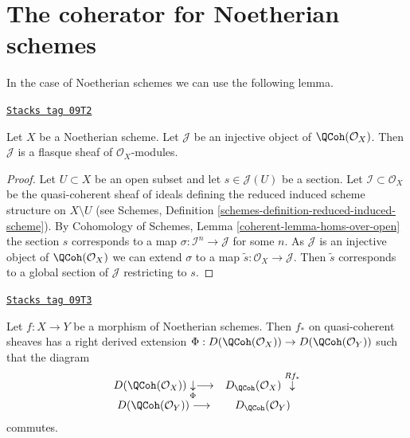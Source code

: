 \section{The coherator for Noetherian schemes}
\label{perfect-section-coherator-Noetherian}
In the case of Noetherian schemes we can use the following lemma.

\begin{lemma}
\label{perfect-lemma-injective-quasi-coherent-sheaf-Noetherian}
\href{https://stacks.math.columbia.edu/tag/09T2}{\texttt{Stacks tag 09T2}}

Let $X$ be a Noetherian scheme. Let $\mathcal{J}$ be an injective
object of $\QCoh(\mathcal{O}_X)$. Then $\mathcal{J}$
is a flasque sheaf of $\mathcal{O}_X$-modules.
\end{lemma}

\begin{proof}
Let $U \subset X$ be an open subset and let $s \in \mathcal{J}(U)$ be a section.
Let $\mathcal{I} \subset \mathcal{O}_X$ be the quasi-coherent sheaf
of ideals defining the reduced induced scheme structure on $X \setminus U$
(see Schemes, Definition \ref{schemes-definition-reduced-induced-scheme}).
By Cohomology of Schemes, Lemma \ref{coherent-lemma-homs-over-open}
the section $s$ corresponds to a map $\sigma : \mathcal{I}^n \to \mathcal{J}$
for some $n$. As $\mathcal{J}$ is an injective object of
$\QCoh(\mathcal{O}_X)$ we can extend $\sigma$ to a map
$\tilde s : \mathcal{O}_X \to \mathcal{J}$. Then $\tilde s$ corresponds
to a global section of $\mathcal{J}$ restricting to $s$.
\end{proof}

\begin{lemma}
\label{perfect-lemma-Noetherian-pushforward}
\href{https://stacks.math.columbia.edu/tag/09T3}{\texttt{Stacks tag 09T3}}

Let $f : X \to Y$ be a morphism of Noetherian schemes.
Then $f_*$ on quasi-coherent sheaves has a right derived
extension
$\Phi : D(\QCoh(\mathcal{O}_X)) \to D(\QCoh(\mathcal{O}_Y))$
such that the diagram
$$
\begin{array}{cc}D(\QCoh(\mathcal{O}_X)) \underset{\Phi}{\downarrow}\longrightarrow & D_\QCoh(\mathcal{O}_X) \overset{Rf_*}{\downarrow} \\ D(\QCoh(\mathcal{O}_Y)) \longrightarrow & D_\QCoh(\mathcal{O}_Y)\end{array}
$$
commutes.
\end{lemma}

